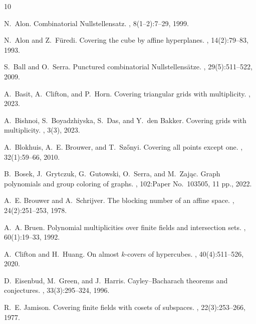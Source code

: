 \documentclass[usenames,dvipsnames, 11pt]{article}
\numberwithin{thm}{section}
\theoremstyle{definition}
\theoremstyle{definition}
\theoremstyle{definition}
\newcommand{\1}{\mathbf{1}}
\begin{document}
\begin{thebibliography}{10}


N.~Alon.
\newblock Combinatorial {N}ullstellensatz.
, 8(1--2):7--29, 1999.

N.~Alon and Z.~F{\"u}redi.
\newblock Covering the cube by affine hyperplanes.
, 14(2):79--83, 1993.


S.~Ball and O.~Serra.
\newblock Punctured combinatorial {N}ullstellens\"{a}tze.
, 29(5):511--522, 2009.

A.~Basit, A.~Clifton, and P.~Horn.
\newblock Covering triangular grids with multiplicity.
, 2023.



A.~Bishnoi, S.~Boyadzhiyska, S.~Das, and Y.~den Bakker.
\newblock Covering grids with multiplicity.
, 3(3), 2023.

A.~Blokhuis, A.~E. Brouwer, and T.~Sz{\H{o}}nyi.
\newblock Covering all points except one.
, 32(1):59--66, 2010.

B.~Bosek, J.~Grytczuk, G.~Gutowski, O.~Serra, and M.~Zaj{\k{a}}c.
\newblock Graph polynomials and group coloring of graphs.
, 102:Paper No.\ 103505, 11 pp., 2022.

A.~E. Brouwer and A.~Schrijver.
\newblock The blocking number of an affine space.
, 24(2):251--253, 1978.

A.~A. Bruen.
\newblock Polynomial multiplicities over finite fields and intersection sets.
, 60(1):19--33, 1992.

A.~Clifton and H.~Huang.
\newblock On almost {$k$}-covers of hypercubes.
, 40(4):511--526, 2020.


D.~Eisenbud, M.~Green, and J.~Harris.
\newblock Cayley--{B}acharach theorems and conjectures.
, 33(3):295--324, 1996.


R.~E. Jamison.
\newblock Covering finite fields with cosets of subspaces.
, 22(3):253--266, 1977.


\end{thebibliography}
\end{document}
